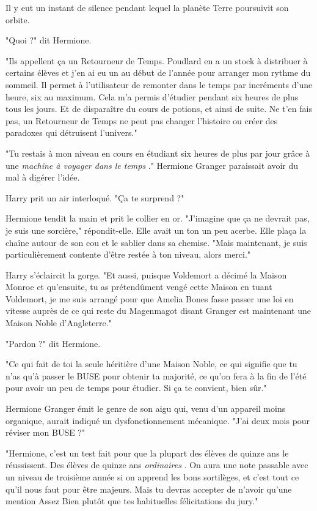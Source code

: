 Il y eut un instant de silence pendant lequel la planète Terre poursuivit son orbite.

"Quoi ?" dit Hermione.

"Ils appellent ça un Retourneur de Temps. Poudlard en a un stock à distribuer à certains élèves et j'en ai eu un au début de l'année pour arranger mon rythme du sommeil. Il permet à l'utilisateur de remonter dans le temps par incréments d'une heure, six au maximum. Cela m'a permis d'étudier pendant six heures de plus tous les jours. Et de disparaître du cours de potions, et ainsi de suite. Ne t'en fais pas, un Retourneur de Temps ne peut pas changer l'histoire ou créer des paradoxes qui détruisent l'univers."

"Tu restais à mon niveau en cours en étudiant six heures de plus par jour grâce à une \emph{machine à voyager dans le temps} ." Hermione Granger paraissait avoir du mal à digérer l'idée.

Harry prit un air interloqué. "Ça te surprend ?"

Hermione tendit la main et prit le collier en or. "J'imagine que ça ne devrait pas, je suis une sorcière," répondit-elle. Elle avait un ton un peu acerbe. Elle plaça la chaîne autour de son cou et le sablier dans sa chemise. "Mais maintenant, je suis particulièrement contente d'être restée à ton niveau, alors merci."

Harry s'éclaircit la gorge. "Et aussi, puisque Voldemort a décimé la Maison Monroe et qu'ensuite, tu as prétendûment vengé cette Maison en tuant Voldemort, je me suis arrangé pour que Amelia Bones fasse passer une loi en vitesse auprès de ce qui reste du Magenmagot disant Granger est maintenant une Maison Noble d'Angleterre."

"Pardon ?" dit Hermione.

"Ce qui fait de toi la seule héritière d'une Maison Noble, ce qui signifie que tu n'as qu'à passer le BUSE pour obtenir ta majorité, ce qu'on fera à la fin de l'été pour avoir un peu de temps pour étudier. Si ça te convient, bien sûr."

Hermione Granger émit le genre de son aigu qui, venu d'un appareil moins organique, aurait indiqué un dysfonctionnement mécanique. "J'ai deux mois pour réviser mon BUSE ?"

"Hermione, c'est un test fait pour que la plupart des élèves de quinze ans le réussissent. Des élèves de quinze ans \emph{ordinaires} . On aura une note passable avec un niveau de troisième année si on apprend les bons sortilèges, et c'est tout ce qu'il nous faut pour être majeurs. Mais tu devras accepter de n'avoir qu'une mention Assez Bien plutôt que tes habituelles félicitations du jury."

